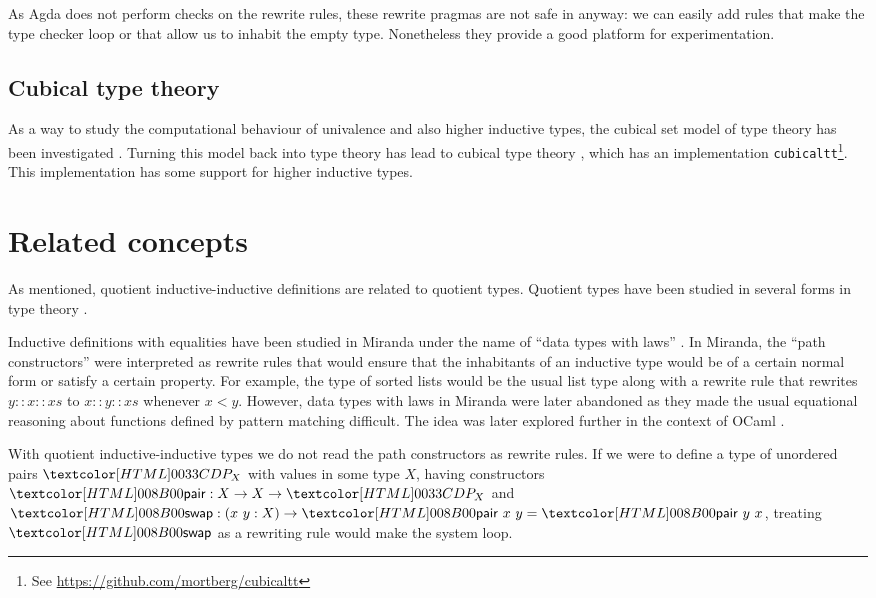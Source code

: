 As Agda does not perform checks on the rewrite rules, these rewrite
pragmas are not safe in anyway: we can easily add rules that make the
type checker loop or that allow us to inhabit the empty
type. Nonetheless they provide a good platform for experimentation.

\subsection{Cubical type theory}

As a way to study the computational behaviour of univalence and also
higher inductive types, the cubical set model of type theory has been
investigated \cite{Bezem2014}. Turning this model back into type
theory has lead to cubical type theory \cite{Cohen2015}, which has an
implementation \verb+cubicaltt+\footnote{See
  \url{https://github.com/mortberg/cubicaltt}}. This implementation
has some support for higher inductive types.

\section{Related concepts}

As mentioned, quotient inductive-inductive definitions are related to
quotient types. Quotient types have been studied in several forms in
type theory \cite{Hofmann1995,Altenkirch2011ii,Nuo2015}.

Inductive definitions with equalities have been studied in Miranda
\cite{Turner1985} under the name of ``data types with laws''
\cite{Thompson1986} \cite{Thompson1990}. In Miranda, the ``path
constructors'' were interpreted as rewrite rules that would ensure
that the inhabitants of an inductive type would be of a certain normal
form or satisfy a certain property. For example, the type of sorted
lists would be the usual list type along with a rewrite rule that
rewrites $y :: x :: xs$ to $x :: y :: xs$ whenever $x < y$. However, data
types with laws in Miranda were later abandoned as they made the usual
equational reasoning about functions defined by pattern matching
difficult. The idea was later explored further in the context of OCaml
\cite{Blanqui2007}.

With quotient inductive-inductive types we do not read the path
constructors as rewrite rules. If we were to define a type of
unordered pairs $\AgdaDatatype{P_X}$ with values in some type $X$,
having constructors
$\AgdaInductiveConstructor{\ident{pair}} : X \to X \to
\AgdaDatatype{P_X}$
and
$\AgdaInductiveConstructor{\ident{swap}} : (x\ y : X) \to
\AgdaInductiveConstructor{\ident{pair}}\ x\ y =
\AgdaInductiveConstructor{\ident{pair}}\ y\ x$,
treating $\AgdaInductiveConstructor{\ident{swap}}$ as a rewriting rule
would make the system loop.
